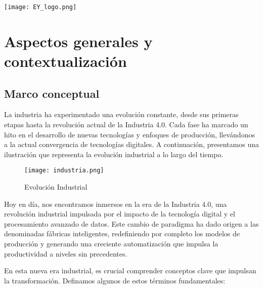 \documentclass{article}
\begin{document}
\begin{center}
    \texttt{[image: EY\_logo.png]}
\end{center}

\section{Aspectos generales y contextualización}

\subsection{Marco conceptual}

La industria ha experimentado una evolución constante, desde sus primeras etapas hasta la revolución actual de la Industria 4.0. Cada fase ha marcado un hito en el desarrollo de nuevas tecnologías y enfoques de producción, llevándonos a la actual convergencia de tecnologías digitales. A continuación, presentamos una ilustración que representa la evolución industrial a lo largo del tiempo.

\begin{center}
\begin{figure}[h]
  \centering
  \texttt{[image: industria.png]}
  \caption{Evolución Industrial}
\end{figure}    
\end{center}

Hoy en día, nos encontramos inmersos en la era de la Industria 4.0, una revolución industrial impulsada por el impacto de la tecnología digital y el procesamiento avanzado de datos. Este cambio de paradigma ha dado origen a las denominadas fábricas inteligentes, redefiniendo por completo los modelos de producción y generando una creciente automatización que impulsa la productividad a niveles sin precedentes.

En esta nueva era industrial, es crucial comprender conceptos clave que impulsan la transformación. Definamos algunos de estos términos fundamentales:
\end{document}
